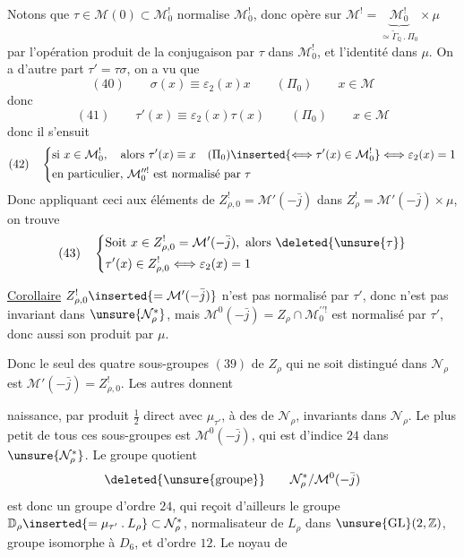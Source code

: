 

Notons que $\tau\in\mathcal{M}(0)\subset\mathcal{M}_{0}^{!}$
normalise $\mathcal{M}_{0}^{!}$, donc
 opère
 sur
$\mathcal{M}^{!}
=\underbrace{\mathcal{M}_{0}^{!}}_{\simeq\widetilde{\Gamma}_{\mathbb{Q}}\mathbin{.}\Pi_{0}}
\times\mu$
par l'opération produit de la conjugaison par $\tau$ dans
$\mathcal{M}_{0}^{!}$, et l'identité dans $\mu$.
On a d'autre part $\tau'=\tau\sigma$, on a vu que
\[
 (40)\qquad
 \sigma(x)\equiv\varepsilon_{2}(x)x\qquad(\Pi_{0})
 \qquad x\in\mathcal{M}
\]
donc
\[
 (41)\qquad
 \tau'(x)\equiv\varepsilon_{2}(x)\tau(x)\qquad(\Pi_{0})
 \qquad x\in\mathcal{M}
\]
donc il s'ensuit
\[
 (42)\quad
 \left\{
 \begin{aligned}
 &\text{si }x\in\mathcal{M}_{0}^{!},\quad
   \text{alors }\tau'(x)\equiv x\quad(\Pi_{0})
   \inserted{\Longleftrightarrow\tau'(x)\in\mathcal{M}_{0}^{!}}
   \Longleftrightarrow\varepsilon_{2}(x)=1\\
 &\text{en particulier, }\mathcal{M}_{0}^{\prime\prime!}
   \text{ est normalisé par }\tau
 \end{aligned}
 \right.
\]
Donc  appliquant ceci aux éléments de
$Z_{\rho,0}^{!}=\mathcal{M}'(-\bar j)$ dans
$Z_{\rho}^{!}=\mathcal{M}'(-\bar j)\times\mu$,
on trouve
\[
 (43)\quad
 \left\{
 \begin{aligned}
 &\text{Soit }x\in Z_{\rho,0}^{!}=\mathcal{M}'(-\bar j),
   \text{ alors }\deleted{\unsure{\tau}}\\
 &\tau'(x)\in Z_{\rho,0}^{!}
   \Longleftrightarrow\varepsilon_{2}(x)=1
 \end{aligned}
 \right.
\]

\uline{Corollaire}\quad
$Z_{\rho,0}^{!}\inserted{=\mathcal{M}'(-\bar j)}$
n'est pas normalisé par $\tau'$, donc n'est pas invariant dans
$\unsure{\mathcal{N}_{\rho}^{*}}$,
mais 
$\mathcal{M}^{0}(-\bar j)=Z_{\rho}\cap\mathcal{M}_{0}^{\prime\prime!}$
est normalisé par $\tau'$, donc aussi son produit par $\mu$.

Donc le seul des quatre sous-groupes $(39)$ de $Z_{\rho}$
qui ne soit distingué dans $\mathcal{N}_{\rho}$ est
$\mathcal{M}'(-\bar j)=Z_{\rho,0}^{!}$.
Les autres donnent



naissance, par produit $\frac12$ direct avec $\mu_{\tau'}$,
à des  de $\mathcal{N}_{\rho}$,
invariants dans $\mathcal{N}_{\rho}$.
Le plus petit de tous ces sous-groupes est
$\mathcal{M}^{0}(-\bar j)$, qui est d'indice $24$ dans
$\unsure{\mathcal{N}_{\rho}^{*}}$.
Le groupe quotient 
\[
 \deleted{\unsure{\text{groupe}}}\qquad
 \mathcal{N}_{\rho}^{*}/\mathcal{M}^{0}(-\bar j)
\]
est donc un groupe d'ordre $24$, qui reçoit d'ailleurs le groupe
$\mathbb{D}_{\rho}
\inserted{=\mu_{\tau'}\mathbin{.}L_{\rho}}
\subset\mathcal{N}_{\rho}^{*}$,
normalisateur de $L_{\rho}$ dans
$\unsure{\operatorname{GL}}(2,\mathbb{Z})$,
groupe isomorphe à $D_{6}$, et d'ordre $12$.
Le noyau de

